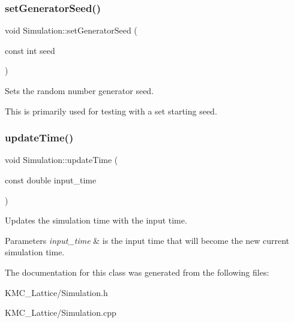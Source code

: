 \subsubsection{\texorpdfstring{set\+Generator\+Seed()}{setGeneratorSeed()}}
{\footnotesize\ttfamily void Simulation\+::set\+Generator\+Seed (\begin{DoxyParamCaption}\item[{const int}]{seed }\end{DoxyParamCaption})}



Sets the random number generator seed. 

This is primarily used for testing with a set starting seed. \mbox{\label{class_simulation_a1affa7d0725c3d10663095619dcb9208}} 
\subsubsection{\texorpdfstring{update\+Time()}{updateTime()}}
{\footnotesize\ttfamily void Simulation\+::update\+Time (\begin{DoxyParamCaption}\item[{const double}]{input\+\_\+time }\end{DoxyParamCaption})\hspace{0.3cm}{\ttfamily [protected]}}



Updates the simulation time with the input time. 


\begin{DoxyParams}{Parameters}
{\em input\+\_\+time} & is the input time that will become the new current simulation time. \\
\hline
\end{DoxyParams}


The documentation for this class was generated from the following files\+:\begin{DoxyCompactItemize}
\item 
K\+M\+C\+\_\+\+Lattice/Simulation.\+h\item 
K\+M\+C\+\_\+\+Lattice/Simulation.\+cpp\end{DoxyCompactItemize}
